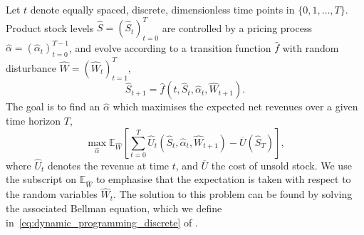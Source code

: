 \documentclass[main.tex]{subfiles}
\begin{document}
Let $t$ denote equally spaced, discrete, dimensionless time points in $\{0,1,\dots,T\}$.
Product stock levels $\hat{S}={(\hat{S}_t)}_{t=0}^T$ are controlled by a pricing process
$\hat{\alpha}={(\hat{\alpha}_t)}_{t=0}^{T-1}$, and evolve according to a transition function $\hat{f}$ with random disturbance
$\hat{W}={(\hat{W}_t)}_{t=1}^T$,
\begin{equation}
  \hat{S}_{t+1}=\hat{f}(t,\hat{S}_t,\hat{\alpha}_t,\hat{W}_{t+1}).
\end{equation}
The goal is to find an $\hat{\alpha}$ which maximises the expected net revenues over a
given time horizon $T$,
\begin{equation}
  \max_{\hat{\alpha}}\mathbb{E}_{\hat{W}}\left[ \sum_{t=0}^T\hat{U}_t(\hat{S}_t,\hat{\alpha}_t,\hat{W}_{t+1})
    - \overline{U}(\hat{S}_T)\right],
\end{equation}
where $\hat{U}_t$ denotes the revenue at time $t$, and $\overline{U}$ the
cost of unsold stock.
We use the subscript on $\mathbb{E}_{\hat{W}}$ to emphasise that the
expectation is taken with respect to the random variables $\hat{W}_t$.
The solution to this problem can be found by solving the associated
Bellman equation, which we define
in~\eqref{eq:dynamic_programming_discrete} of
.
\end{document}
